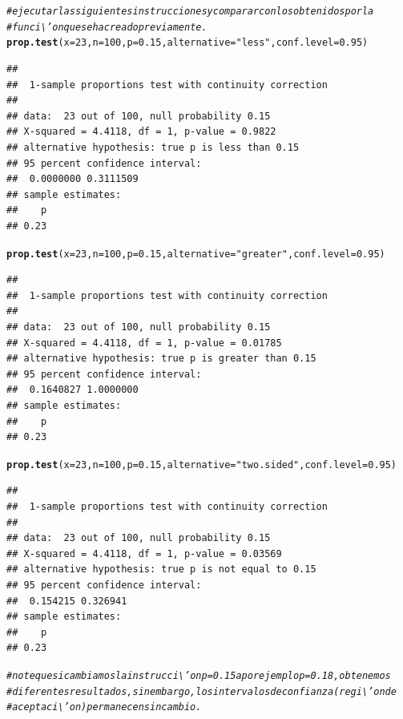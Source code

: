 \documentclass[12pt,letterpaper]{article}\usepackage[]{graphicx}\usepackage[]{color}
\makeatletter
\newcommand{\hlnum}[1]{\textcolor[rgb]{0.686,0.059,0.569}{#1}}%
\newcommand{\hlstr}[1]{\textcolor[rgb]{0.192,0.494,0.8}{#1}}%
\newcommand{\hlcom}[1]{\textcolor[rgb]{0.678,0.584,0.686}{\textit{#1}}}%
\newcommand{\hlstd}[1]{\textcolor[rgb]{0.345,0.345,0.345}{#1}}%
\newcommand{\hlkwc}[1]{\textcolor[rgb]{0.333,0.667,0.333}{#1}}%
\newcommand{\hlkwd}[1]{\textcolor[rgb]{0.737,0.353,0.396}{\textbf{#1}}}%
\newenvironment{kframe}{%
 \def\at@end@of@kframe{}%
 \ifinner\ifhmode%
  \def\at@end@of@kframe{\end{minipage}}%
  \begin{minipage}{\columnwidth}%
 \fi\fi%
 \def\FrameCommand##1{\hskip\@totalleftmargin \hskip-\fboxsep
 \colorbox{shadecolor}{##1}\hskip-\fboxsep
     \hskip-\linewidth \hskip-\@totalleftmargin \hskip\columnwidth}%
 \MakeFramed {\advance\hsize-\width
   \@totalleftmargin\z@ \linewidth\hsize
   \@setminipage}}%
 {\par\unskip\endMakeFramed%
 \at@end@of@kframe}
\newenvironment{knitrout}{}{} %
\makeatother
\begin{document}
\begin{knitrout}
\color{fgcolor}\begin{kframe}
\begin{alltt}
\hlcom{# ejecutar las siguientes instrucciones y comparar con los obtenidos por la }
\hlcom{# funci\textbackslash{}'on que se ha creado previamente. }
\hlkwd{prop.test}\hlstd{(}\hlkwc{x}\hlstd{=}\hlnum{23}\hlstd{,} \hlkwc{n}\hlstd{=}\hlnum{100}\hlstd{,} \hlkwc{p}\hlstd{=}\hlnum{0.15}\hlstd{,} \hlkwc{alternative}\hlstd{=}\hlstr{"less"}\hlstd{,} \hlkwc{conf.level}\hlstd{=}\hlnum{0.95}\hlstd{)}
\end{alltt}
\begin{verbatim}
## 
## 	1-sample proportions test with continuity correction
## 
## data:  23 out of 100, null probability 0.15
## X-squared = 4.4118, df = 1, p-value = 0.9822
## alternative hypothesis: true p is less than 0.15
## 95 percent confidence interval:
##  0.0000000 0.3111509
## sample estimates:
##    p 
## 0.23
\end{verbatim}
\begin{alltt}
\hlkwd{prop.test}\hlstd{(}\hlkwc{x}\hlstd{=}\hlnum{23}\hlstd{,} \hlkwc{n}\hlstd{=}\hlnum{100}\hlstd{,} \hlkwc{p}\hlstd{=}\hlnum{0.15}\hlstd{,} \hlkwc{alternative}\hlstd{=}\hlstr{"greater"}\hlstd{,} \hlkwc{conf.level}\hlstd{=}\hlnum{0.95}\hlstd{)}
\end{alltt}
\begin{verbatim}
## 
## 	1-sample proportions test with continuity correction
## 
## data:  23 out of 100, null probability 0.15
## X-squared = 4.4118, df = 1, p-value = 0.01785
## alternative hypothesis: true p is greater than 0.15
## 95 percent confidence interval:
##  0.1640827 1.0000000
## sample estimates:
##    p 
## 0.23
\end{verbatim}
\begin{alltt}
\hlkwd{prop.test}\hlstd{(}\hlkwc{x}\hlstd{=}\hlnum{23}\hlstd{,} \hlkwc{n}\hlstd{=}\hlnum{100}\hlstd{,} \hlkwc{p}\hlstd{=}\hlnum{0.15}\hlstd{,} \hlkwc{alternative}\hlstd{=}\hlstr{"two.sided"}\hlstd{,} \hlkwc{conf.level}\hlstd{=}\hlnum{0.95}\hlstd{)}
\end{alltt}
\begin{verbatim}
## 
## 	1-sample proportions test with continuity correction
## 
## data:  23 out of 100, null probability 0.15
## X-squared = 4.4118, df = 1, p-value = 0.03569
## alternative hypothesis: true p is not equal to 0.15
## 95 percent confidence interval:
##  0.154215 0.326941
## sample estimates:
##    p 
## 0.23
\end{verbatim}
\begin{alltt}
\hlcom{# note que si cambiamos la instrucci\textbackslash{}'on p=0.15 a por ejemplo p=0.18, obtenemos }
\hlcom{# diferentes resultados, sin embargo, los intervalos de confianza (regi\textbackslash{}'on de }
\hlcom{# aceptaci\textbackslash{}'on) permanecen sin cambio.}
\end{alltt}
\end{kframe}
\end{knitrout}
\end{document}
